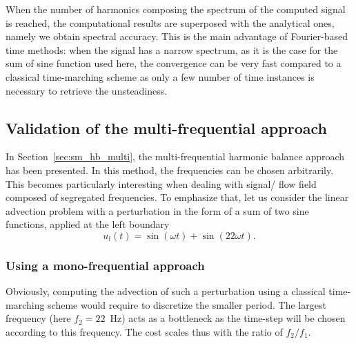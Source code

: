 When the number of harmonics composing the spectrum of the
computed signal is reached, the computational results are superposed
with the analytical ones, namely we obtain spectral accuracy.
This is the main advantage of Fourier-based time methods: when the
signal has a narrow spectrum, as it is the case for the sum
of sine function used here, the
convergence can be very fast compared to a classical time-marching scheme
as only a few number of time instances is necessary to retrieve the
unsteadiness.


\subsection{Validation of the multi-frequential approach}

In Section~\ref{sec:sm_hb_multi}, the multi-frequential harmonic
balance approach has been presented. In this method,
the frequencies can be chosen arbitrarily. This becomes particularly
interesting when dealing with signal/ flow field composed of segregated
frequencies. To emphasize that, let us consider the linear advection problem
with a perturbation 
in the form of a sum of two sine functions,
applied at the left boundary
\begin{equation}
    u_l(t) = \sin(\omega t) + \sin(22 \omega t).
    \label{eq:multifreq_inj_func}
\end{equation}

\subsubsection{Using a mono-frequential approach}

Obviously, computing the advection of such a perturbation using
a classical time-marching scheme would require to discretize the
smaller period. The largest frequency
(here $f_2 = 22$~Hz) acts as a bottleneck as the time-step will be chosen
according to this frequency. The cost scales thus with the ratio of $f_2 / f_1$.

